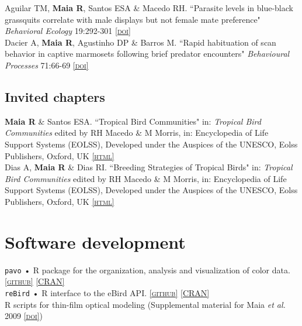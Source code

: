 \documentclass[10pt]{article}
\newcommand{\html}[1]{\href{#1}{\scriptsize\textsc{[html]}}}
\newcommand{\github}[1]{\href{#1}{\scriptsize\textsc{[github]}}}
\newcommand{\CRAN}[1]{\href{#1}{\scriptsize\textsc{[CRAN]}}}
\newcommand{\doi}[1]{\href{http://dx.doi.org/#1}{\scriptsize\textsc{[doi]}}}
\newcommand{\years}[1]{\marginnote{\raggedleft\scriptsize #1}}
\begin{document}
\years{2008} Aguilar TM,  \textbf{Maia R}, Santos ESA \& Macedo RH. “Parasite levels in blue-black grassquits correlate with male displays but not female mate preference" \emph{Behavioral Ecology} 19:292-301 \doi{10.1093/beheco/arm130}\\

\years{2006} Dacier A,  \textbf{Maia R}, Agustinho DP \& Barros M. “Rapid habituation of scan behavior in captive marmosets following brief predator encounters" \emph{Behavioural Processes} 71:66-69 \doi{10.1016/j.beproc.2005.09.006}

\subsection*{Invited chapters}
\years{2008}  \textbf{Maia R} \& Santos ESA. “Tropical Bird Communities" in: \emph{Tropical Bird Communities} edited by RH Macedo \& M Morris, in: Encyclopedia of Life Support Systems (EOLSS), Developed under the Auspices of the UNESCO, Eolss Publishers, Oxford, UK \html{http://www.eolss.net/}\\

\years{} Dias A,  \textbf{Maia R} \& Dias RI. “Breeding Strategies of Tropical Birds" in: \emph{Tropical Bird Communities} edited by RH Macedo \& M Morris, in: Encyclopedia of Life Support Systems (EOLSS), Developed under the Auspices of the UNESCO, Eolss Publishers, Oxford, UK \html{http://www.eolss.net/}\\


\section*{Software development}
\texttt{pavo} • R package for the organization, analysis and visualization of color data. \github{https://github.com/rmaia/pavo}  \CRAN{http://cran.r-project.org/web/packages/pavo/index.html}\\
\texttt{reBird} • R interface to the eBird API. \github{https://github.com/ropensci/rebird}  \CRAN{http://cran.r-project.org/web/packages/rebird/index.html}\\
R scripts for thin-film optical modeling (Supplemental material for Maia \emph{et al.} 2009  \doi{10.1098/rsif.2008.0460.focus})\\

\end{document}
